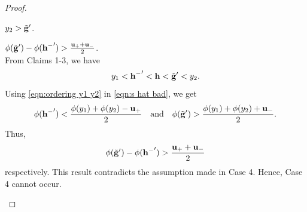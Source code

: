 \begin{proof}
\begin{claims}{$y_2 > \tilde{\mathbf{g}}'$.}
\end{claims}


\begin{claims}{$\phi(\tilde{\mathbf{g}}') - \phi(\mathbf{h^{-}}') > \frac{\mathbf{u_+} + \mathbf{u_-}}{2}$.}\\
	From Claims 1-3, we have
	\begin{equation}\label{eqn:ordering y1 y2}
		y_1 < \mathbf{h^{-}}' < \mathbf{h} < \tilde{\mathbf{g}}' < y_2.
	\end{equation}
	Using \eqref{eqn:ordering y1 y2} in \eqref{eqn:s hat bad}, we get
	\[\phi(\mathbf{h^{-}}') < \frac{\phi(y_1) + \phi(y_2) - \mathbf{u_+}}{2} \hbox{\quad and\quad}
 \phi(\tilde{\mathbf{g}}') > \frac{\phi(y_1) + \phi(y_2) + \mathbf{u_-}}{2}.
	\]
	Thus,
	\[
	\phi(\tilde{\mathbf{g}}') - \phi(\mathbf{h^{-}}') > \frac{\mathbf{u_+} + \mathbf{u_-}}{2}
	\] respectively.
	This result contradicts the assumption made in Case 4. Hence, Case 4 cannot occur.
\end{claims}


\end{proof}
